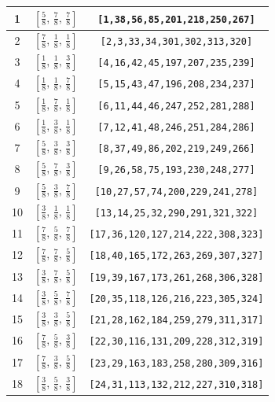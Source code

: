 \documentclass[fleqn,8pt]{jsarticle}
\begin{document}
\begin{longtable}{ccc}
1 & $\left[ \frac{5}{8},\, \frac{7}{8},\, \frac{7}{8} \right]$ & {\tt [1,38,56,85,201,218,250,267]} \\ \hline
2 & $\left[ \frac{7}{8},\, \frac{1}{8},\, \frac{1}{8} \right]$ & {\tt [2,3,33,34,301,302,313,320]} \\ \hline
3 & $\left[ \frac{1}{8},\, \frac{1}{8},\, \frac{3}{8} \right]$ & {\tt [4,16,42,45,197,207,235,239]} \\ \hline
4 & $\left[ \frac{1}{8},\, \frac{1}{8},\, \frac{7}{8} \right]$ & {\tt [5,15,43,47,196,208,234,237]} \\ \hline
5 & $\left[ \frac{1}{8},\, \frac{7}{8},\, \frac{1}{8} \right]$ & {\tt [6,11,44,46,247,252,281,288]} \\ \hline
6 & $\left[ \frac{1}{8},\, \frac{3}{8},\, \frac{1}{8} \right]$ & {\tt [7,12,41,48,246,251,284,286]} \\ \hline
7 & $\left[ \frac{5}{8},\, \frac{3}{8},\, \frac{3}{8} \right]$ & {\tt [8,37,49,86,202,219,249,266]} \\ \hline
8 & $\left[ \frac{5}{8},\, \frac{7}{8},\, \frac{3}{8} \right]$ & {\tt [9,26,58,75,193,230,248,277]} \\ \hline
9 & $\left[ \frac{5}{8},\, \frac{3}{8},\, \frac{7}{8} \right]$ & {\tt [10,27,57,74,200,229,241,278]} \\ \hline
10 & $\left[ \frac{3}{8},\, \frac{1}{8},\, \frac{1}{8} \right]$ & {\tt [13,14,25,32,290,291,321,322]} \\ \hline
11 & $\left[ \frac{7}{8},\, \frac{5}{8},\, \frac{7}{8} \right]$ & {\tt [17,36,120,127,214,222,308,323]} \\ \hline
12 & $\left[ \frac{7}{8},\, \frac{7}{8},\, \frac{5}{8} \right]$ & {\tt [18,40,165,172,263,269,307,327]} \\ \hline
13 & $\left[ \frac{3}{8},\, \frac{7}{8},\, \frac{5}{8} \right]$ & {\tt [19,39,167,173,261,268,306,328]} \\ \hline
14 & $\left[ \frac{3}{8},\, \frac{5}{8},\, \frac{7}{8} \right]$ & {\tt [20,35,118,126,216,223,305,324]} \\ \hline
15 & $\left[ \frac{3}{8},\, \frac{3}{8},\, \frac{5}{8} \right]$ & {\tt [21,28,162,184,259,279,311,317]} \\ \hline
16 & $\left[ \frac{7}{8},\, \frac{5}{8},\, \frac{3}{8} \right]$ & {\tt [22,30,116,131,209,228,312,319]} \\ \hline
17 & $\left[ \frac{7}{8},\, \frac{3}{8},\, \frac{5}{8} \right]$ & {\tt [23,29,163,183,258,280,309,316]} \\ \hline
18 & $\left[ \frac{3}{8},\, \frac{5}{8},\, \frac{3}{8} \right]$ & {\tt [24,31,113,132,212,227,310,318]} \\ \hline

\end{longtable}
\end{document}

